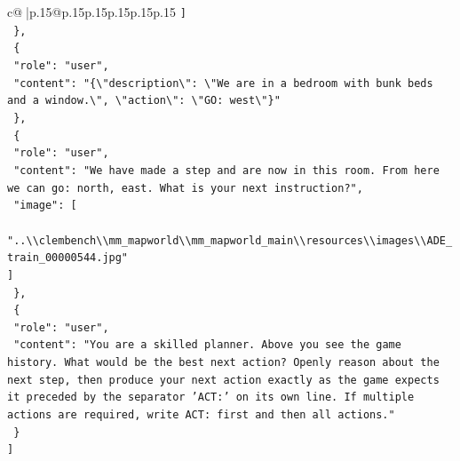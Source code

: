 \documentclass{article}
\begin{document}
{\begin{supertabular}{c@{$\;$}|p{.15\linewidth}@{}p{.15\linewidth}p{.15\linewidth}p{.15\linewidth}p{.15\linewidth}p{.15\linewidth}}
{{{\texttt{    {]}} \\
\texttt{  \},} \\
\texttt{  \{} \\
\texttt{    "role": "user",} \\
\texttt{    "content": "\{\textbackslash{}"description\textbackslash{}": \textbackslash{}"We are in a bedroom with bunk beds and a window.\textbackslash{}", \textbackslash{}"action\textbackslash{}": \textbackslash{}"GO: west\textbackslash{}"\}"} \\
\texttt{  \},} \\
\texttt{  \{} \\
\texttt{    "role": "user",} \\
\texttt{    "content": "We have made a step and are now in this room. From here we can go: north, east. What is your next instruction?",} \\
\texttt{    "image": {[}} \\
\texttt{      "..\textbackslash{}\textbackslash{}clembench\textbackslash{}\textbackslash{}mm\_mapworld\textbackslash{}\textbackslash{}mm\_mapworld\_main\textbackslash{}\textbackslash{}resources\textbackslash{}\textbackslash{}images\textbackslash{}\textbackslash{}ADE\_train\_00000544.jpg"} \\
\texttt{    {]}} \\
\texttt{  \},} \\
\texttt{  \{} \\
\texttt{    "role": "user",} \\
\texttt{    "content": "You are a skilled planner. Above you see the game history. What would be the best next action? Openly reason about the next step, then produce your next action exactly as the game expects it preceded by the separator 'ACT:' on its own line. If multiple actions are required, write ACT: first and then all actions."} \\
\texttt{  \}} \\
\texttt{{]}} \\
            }
        }
    }
     \\ \\


\end{supertabular}}
\end{document}
